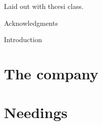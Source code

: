 \documentclass[12pt,oneside,noprintercorrection]{iut}
\begin{document}
\MakeThesisTitlePage


\newpage
\thispagestyle{empty}
\vspace*{\fill}
Laid out with thcesi class.
\newpage


\MakeThesisTitlePageNoLogo


\begin{ThesisAcknowledgments}
\thispagestyle{empty}
Acknowledgments
\end{ThesisAcknowledgments}


\pagestyle{empty}
\WritePartLabelInToc
\tableofcontents
{}
\clearpage
\pagestyle{plain}
\NoChapterHead


Introduction

\chapter{The company}
\chapter{Needings}





\begin{quote}
\end{quote}



\small


\end{document}
